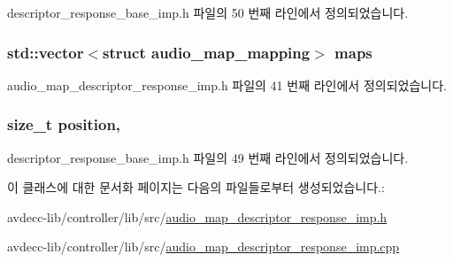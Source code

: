 descriptor\+\_\+response\+\_\+base\+\_\+imp.\+h 파일의 50 번째 라인에서 정의되었습니다.

\subsubsection[{\texorpdfstring{maps}{maps}}]{\setlength{\rightskip}{0pt plus 5cm}std\+::vector$<$struct {\bf audio\+\_\+map\+\_\+mapping}$>$ maps\hspace{0.3cm}{\ttfamily [private]}}\hypertarget{classavdecc__lib_1_1audio__map__descriptor__response__imp_abab36d4d2ed4dc7caed24d72f0806a83}{}\label{classavdecc__lib_1_1audio__map__descriptor__response__imp_abab36d4d2ed4dc7caed24d72f0806a83}


audio\+\_\+map\+\_\+descriptor\+\_\+response\+\_\+imp.\+h 파일의 41 번째 라인에서 정의되었습니다.

\subsubsection[{\texorpdfstring{position}{position}}]{\setlength{\rightskip}{0pt plus 5cm}size\+\_\+t position\hspace{0.3cm}{\ttfamily [protected]}, {\ttfamily [inherited]}}\hypertarget{classavdecc__lib_1_1descriptor__response__base__imp_a7a04afe5347934be732ec70a70bd0a28}{}\label{classavdecc__lib_1_1descriptor__response__base__imp_a7a04afe5347934be732ec70a70bd0a28}


descriptor\+\_\+response\+\_\+base\+\_\+imp.\+h 파일의 49 번째 라인에서 정의되었습니다.



이 클래스에 대한 문서화 페이지는 다음의 파일들로부터 생성되었습니다.\+:\begin{DoxyCompactItemize}
\item 
avdecc-\/lib/controller/lib/src/\hyperlink{audio__map__descriptor__response__imp_8h}{audio\+\_\+map\+\_\+descriptor\+\_\+response\+\_\+imp.\+h}\item 
avdecc-\/lib/controller/lib/src/\hyperlink{audio__map__descriptor__response__imp_8cpp}{audio\+\_\+map\+\_\+descriptor\+\_\+response\+\_\+imp.\+cpp}\end{DoxyCompactItemize}
